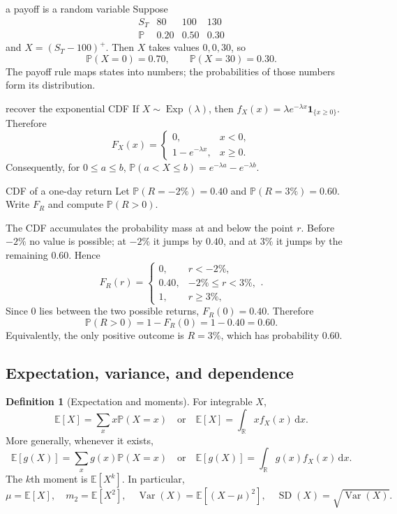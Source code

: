 \documentclass[10pt]{article}
\newcommand{\E}{\mathbb E}
\newcommand{\Pbb}{\mathbb P}
\newcommand{\Var}{\operatorname{Var}}
\newcommand{\SD}{\operatorname{SD}}
\newcommand{\R}{\mathbb R}
\newcommand{\1}{\mathbf 1}
\newcommand{\dd}{\,\mathrm d}
\theoremstyle{definition}
\newtheorem{definition}{Definition}[section]
\begin{document}
\begin{boardexample}{a payoff is a random variable}
Suppose
\[
\begin{array}{c|ccc}
S_T&80&100&130\\ \hline
\Pbb&0.20&0.50&0.30
\end{array}
\]
and $X=(S_T-100)^+$. Then $X$ takes values $0,0,30$, so
\[
\Pbb(X=0)=0.70,
\qquad
\Pbb(X=30)=0.30.
\]
The payoff rule maps states into numbers; the probabilities of those numbers
form its distribution.
\end{boardexample}

\begin{boardexample}{recover the exponential CDF}
If $X\sim\operatorname{Exp}(\lambda)$, then
$f_X(x)=\lambda e^{-\lambda x}\1_{\{x\ge0\}}$. Therefore
\[
F_X(x)=\begin{cases}
0,&x<0,\\
1-e^{-\lambda x},&x\ge0.
\end{cases}
\]
Consequently, for $0\le a\le b$,
$\Pbb(a<X\le b)=e^{-\lambda a}-e^{-\lambda b}$.
\end{boardexample}

\begin{studentexercise}{CDF of a one-day return}
Let $\Pbb(R=-2\%)=0.40$ and $\Pbb(R=3\%)=0.60$. Write $F_R$ and compute
$\Pbb(R>0)$.
\end{studentexercise}
\begin{shortsolution}
The CDF accumulates the probability mass at and below the point $r$. Before
$-2\%$ no value is possible; at $-2\%$ it jumps by $0.40$, and at $3\%$ it
jumps by the remaining $0.60$. Hence
\[
F_R(r)=\begin{cases}
0,&r<-2\%,\\
0.40,&-2\%\le r<3\%,\\
1,&r\ge3\%,
\end{cases}.
\]
Since $0$ lies between the two possible returns, $F_R(0)=0.40$. Therefore
\[
\Pbb(R>0)=1-F_R(0)=1-0.40=0.60.
\]
Equivalently, the only positive outcome is $R=3\%$, which has probability
$0.60$.
\end{shortsolution}

\subsection{Expectation, variance, and dependence}

\begin{definition}[Expectation and moments]
For integrable $X$,
\[
\E[X]=\sum_x x\Pbb(X=x)
\quad\text{or}\quad
\E[X]=\int_{\R}x f_X(x)\dd x.
\]
More generally, whenever it exists,
\[
\E[g(X)]=\sum_x g(x)\Pbb(X=x)
\quad\text{or}\quad
\E[g(X)]=\int_{\R}g(x)f_X(x)\dd x.
\]
The $k$th moment is $\E[X^k]$. In particular,
\[
\mu=\E[X],
\quad m_2=\E[X^2],
\quad \Var(X)=\E[(X-\mu)^2],
\quad \SD(X)=\sqrt{\Var(X)}.
\]
\end{definition}
\end{document}
